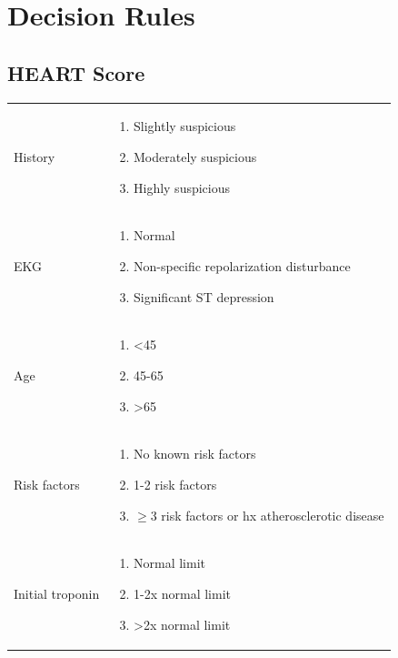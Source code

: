 \documentclass[8pt]{extarticle}
\begin{document}
\section{Decision Rules}

\subsection{HEART Score}

\begin{tabularx}{\linewidth}{|X|X|}
\hline
History & 
    \begin{enumerate}
        \item{Slightly suspicious}
        \item{Moderately suspicious}
        \item{Highly suspicious}
    \end{enumerate}
    \\

EKG &
    \begin{enumerate}
        \item{Normal}
        \item{Non-specific repolarization disturbance}
        \item{Significant ST depression}
    \end{enumerate}
    \\
    
Age &
    \begin{enumerate}
        \item{<45}
        \item{45-65}
        \item{>65}
    \end{enumerate}
    \\
    
Risk factors &
    \begin{enumerate}
        \item{No known risk factors}
        \item{1-2 risk factors}
        \item{$\geq$3 risk factors or hx atherosclerotic disease}
    \end{enumerate}
    \\

Initial troponin &
    \begin{enumerate}
        \item{Normal limit}
        \item{1-2x normal limit}
        \item{>2x normal limit}
    \end{enumerate}
    \\
\hline
\end{tabularx}
\end{document}
